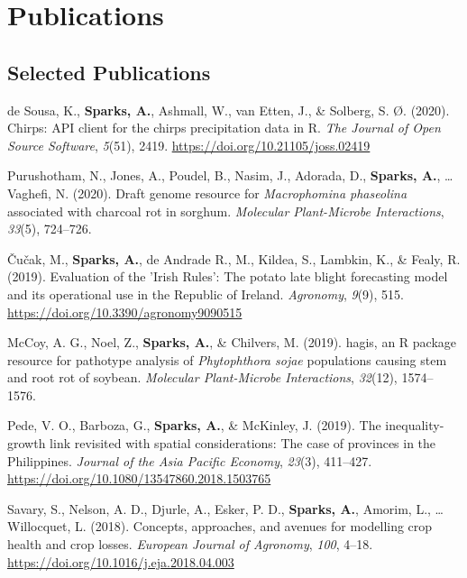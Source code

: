 \documentclass[11pt, a4paper]{awesome-cv}
\begin{document}
\hypertarget{publications}{%
\section{Publications}\label{publications}}

\hypertarget{selected-publications}{%
\subsection{Selected Publications}\label{selected-publications}}

\begingroup
\setlength{\parindent}{-0.5in}
\setlength{\leftskip}{0.5in}

\hypertarget{refs_articles}{}
\leavevmode\hypertarget{ref-deSousa2020}{}%
de Sousa, K., \textbf{Sparks, A.}, Ashmall, W., van Etten, J., \& Solberg, S. Ø. (2020). Chirps: API client for the chirps precipitation data in R. \emph{The Journal of Open Source Software}, \emph{5}(51), 2419. \url{https://doi.org/10.21105/joss.02419}

\leavevmode\hypertarget{ref-Purushotham2020}{}%
Purushotham, N., Jones, A., Poudel, B., Nasim, J., Adorada, D., \textbf{Sparks, A.}, \ldots{} Vaghefi, N. (2020). Draft genome resource for \emph{Macrophomina phaseolina} associated with charcoal rot in sorghum. \emph{Molecular Plant-Microbe Interactions}, \emph{33}(5), 724--726.

\leavevmode\hypertarget{ref-cucak2019evaluation}{}%
Čučak, M., \textbf{Sparks, A.}, de Andrade R., M., Kildea, S., Lambkin, K., \& Fealy, R. (2019). Evaluation of the 'Irish Rules': The potato late blight forecasting model and its operational use in the Republic of Ireland. \emph{Agronomy}, \emph{9}(9), 515. \url{https://doi.org/10.3390/agronomy9090515}

\leavevmode\hypertarget{ref-McCoy2019}{}%
McCoy, A. G., Noel, Z., \textbf{Sparks, A.}, \& Chilvers, M. (2019). hagis, an R package resource for pathotype analysis of \emph{Phytophthora sojae} populations causing stem and root rot of soybean. \emph{Molecular Plant-Microbe Interactions}, \emph{32}(12), 1574--1576.

\leavevmode\hypertarget{ref-Pede2019}{}%
Pede, V. O., Barboza, G., \textbf{Sparks, A.}, \& McKinley, J. (2019). The inequality-growth link revisited with spatial considerations: The case of provinces in the Philippines. \emph{Journal of the Asia Pacific Economy}, \emph{23}(3), 411--427. \url{https://doi.org/10.1080/13547860.2018.1503765}

\leavevmode\hypertarget{ref-Savary2018}{}%
Savary, S., Nelson, A. D., Djurle, A., Esker, P. D., \textbf{Sparks, A.}, Amorim, L., \ldots{} Willocquet, L. (2018). Concepts, approaches, and avenues for modelling crop health and crop losses. \emph{European Journal of Agronomy}, \emph{100}, 4--18. \url{https://doi.org/10.1016/j.eja.2018.04.003}
\end{document}
